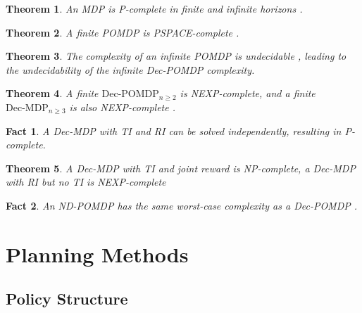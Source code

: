 \documentclass{article} %
\newtheorem{theorem}{Theorem}
\newtheorem{fact}{Fact}
\begin{document}
\begin{theorem}
    An MDP is P-complete in finite and infinite horizons \cite{Papadimitriou1987}.
\end{theorem}

\begin{theorem}
    A finite POMDP is PSPACE-complete \cite{Papadimitriou1987}.
\end{theorem}

\begin{theorem}
    The complexity of an infinite POMDP is undecidable \cite{undecidable}, leading to the undecidability of the infinite Dec-POMDP complexity.
\end{theorem}

\begin{theorem}
    A finite $\text{Dec-POMDP}_{n\geqslant2}$ is NEXP-complete, and a finite $\text{Dec-MDP}_{n\geqslant3}$ is also NEXP-complete \cite{shlomo2002}.
\end{theorem}

\begin{fact}
    A Dec-MDP with TI and RI can be solved independently, resulting in P-complete.
\end{fact}

\begin{theorem}
    A Dec-MDP with TI and joint reward is NP-complete, a Dec-MDP with RI but no TI is NEXP-complete \cite{becker2004solving}
\end{theorem}

\begin{fact}
    An ND-POMDP has the same worst-case complexity as a Dec-POMDP \cite{Nair2005}.
\end{fact} 

\section{Planning Methods}
\subsection{Policy Structure}
\end{document}
